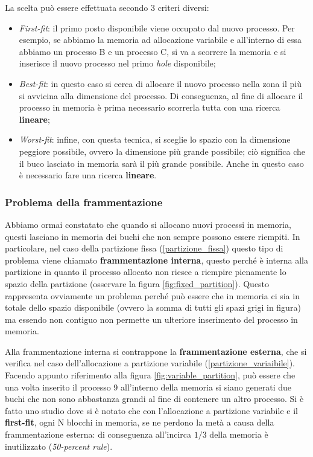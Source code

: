 \noindent La scelta può essere effettuata secondo 3 criteri diversi:
\vspace{-5px}
\begin{itemize}
\setlength{\itemsep}{-.15 em}
    \item \textit{First-fit}: il primo posto disponibile viene occupato dal nuovo processo. Per esempio, se abbiamo la memoria ad allocazione variabile e all'interno di essa abbiamo un processo B e un processo C, si va a scorrere la memoria e si inserisce il nuovo processo nel primo \textit{hole} disponibile;
    \item \textit{Best-fit}: in questo caso si cerca di allocare il nuovo processo nella zona il più si avvicina alla dimensione del processo. Di conseguenza, al fine di allocare il processo in memoria è prima necessario scorrerla tutta con una ricerca \textbf{lineare};
    \item \textit{Worst-fit}: infine, con questa tecnica, si sceglie lo spazio con la dimensione peggiore possibile, ovvero la dimensione più grande possibile; ciò significa che il buco lasciato in memoria sarà il più grande possibile. Anche in questo caso è necessario fare una ricerca \textbf{lineare}.
\end{itemize}

% 
\subsubsection{Problema della frammentazione}\label{frammentazione}
Abbiamo ormai constatato che quando si allocano nuovi processi in memoria, questi lasciano in memoria dei buchi che non sempre possono essere riempiti. In particolare, nel caso della partizione fissa (\ref{partizione_fissa}) questo tipo di problema viene chiamato \textbf{frammentazione interna}, questo perché è interna alla partizione in quanto il processo allocato non riesce a riempire pienamente lo spazio della partizione (osservare la figura \ref{fig:fixed_partition}). Questo rappresenta ovviamente un problema perché può essere che in memoria ci sia in totale dello spazio disponibile (ovvero la somma di tutti gli spazi grigi in figura) ma essendo non contiguo non permette un ulteriore inserimento del processo in memoria. 

Alla frammentazione interna si contrappone la \textbf{frammentazione esterna}, che si verifica nel caso dell'allocazione a partizione variabile (\ref{partizione_variaibile}). Facendo appunto riferimento alla figura \ref{fig:variable_partition}, può essere che una volta inserito il processo 9 all'interno della memoria si siano generati due buchi che non sono abbastanza grandi al fine di contenere un altro processo. Si è fatto uno studio dove si è notato che con l'allocazione a partizione variabile e il \textbf{first-fit}, ogni N blocchi in memoria, se ne perdono la metà a causa della frammentazione esterna: di conseguenza all'incirca $1/3$ della memoria è inutilizzato (\textit{50-percent rule}). 


